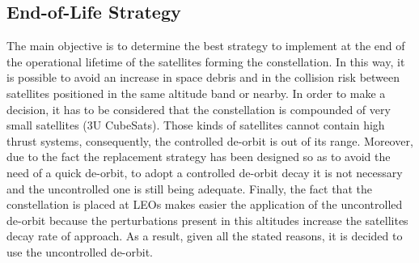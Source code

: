 \subsection{End-of-Life Strategy}

The main objective is to determine the best strategy to implement at the end of the operational lifetime of the satellites forming the constellation. In this way, it is possible to avoid an increase in space debris and in the collision risk between satellites positioned in the same altitude band or nearby.
\newline\newline
In order to make a decision, it has to be considered that the constellation is compounded of very small satellites (3U CubeSats). Those kinds of satellites cannot contain high thrust systems, consequently, the controlled de-orbit is out of its range. Moreover, due to the fact the replacement strategy has been designed so as to avoid the need of a quick de-orbit, to adopt a controlled de-orbit decay it is not necessary and the uncontrolled one is still being adequate. Finally, the fact that the constellation is placed at LEOs makes easier the application of the uncontrolled de-orbit because the perturbations present in this altitudes increase the satellites decay rate of approach. As a result, given all the stated reasons, it is decided to use the uncontrolled de-orbit. 


